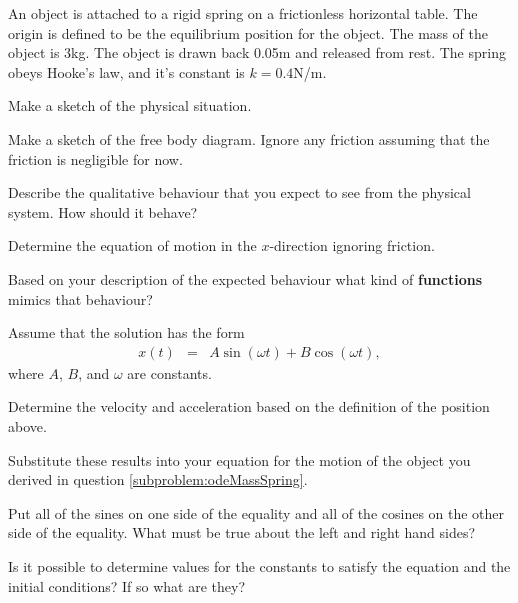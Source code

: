 \begin{problem}

\item An object is attached to a rigid spring on a frictionless
  horizontal table. The origin is defined to be the equilibrium
  position for the object. The mass of the object is 3kg. The object
  is drawn back 0.05m and released from rest. The spring obeys Hooke's
  law, and it's constant is $k=0.4$N/m.
  \begin{subproblem}
    \item Make a sketch of the physical situation.
      \vfill
    \item Make a sketch of the free body diagram. Ignore any friction
      assuming that the friction is negligible for now.
      \vfill
    \item Describe the qualitative behaviour that you expect to see
      from the physical system. How should it behave? 
      \vfill
    \item Determine the equation of motion in the $x$-direction
      ignoring friction.
      \label{subproblem:odeMassSpring}
      \vfill

    \item Based on your description of the expected behaviour what
      kind of \textbf{functions} mimics that behaviour?
      \vspace{3em}

      \clearpage

    \item Assume that the solution has the form
      \begin{eqnarray*}
        x(t) & = & A \sin(\omega t) + B \cos(\omega t),
      \end{eqnarray*}
      where $A$, $B$, and $\omega$ are constants.
      \begin{subproblem}
      \item Determine the velocity and acceleration based on the
        definition of the position above.
        \vfill
      \item Substitute these results into your equation for the motion
        of the object you derived in question
        \ref{subproblem:odeMassSpring}.
        \vfill
        \clearpage
      \item Put all of the sines on one side of the equality and all
        of the cosines on the other side of the equality. What must be
        true about the left and right hand sides?
        \vspace{6em}
      \item Is it possible to determine values for the constants to
        satisfy the equation and the initial conditions? If so what
        are they?
        \vfill
      \end{subproblem}

  \end{subproblem}
\end{problem}

